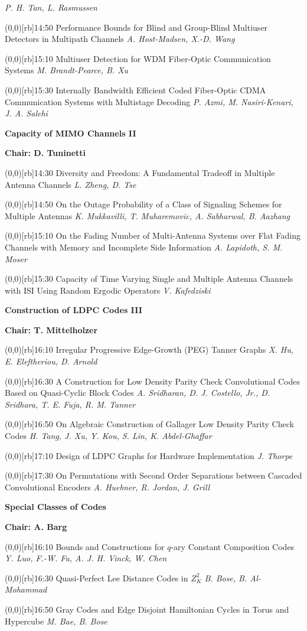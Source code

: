 \documentclass[a5paper,twoside]{article}
\def\period#1{\flushleft{\large\bfseries #1}\markboth{\sf #1}{\sf #1}}
\def\sesstitle#1{\vspace{.45\bigskipamount}\par{\bfseries #1}\par}
\def\sesschair#1{{\bfseries Chair: #1}\par\vspace{.65\medskipamount}}
\def\papertime#1{\makebox(0,0)[rb]{{\scriptsize #1}\hspace{.5em}}}
\def\papertitle#1{#1\hfil\break}
\def\paperauthors#1{{\itshape #1}\par\filbreak\vspace{.65\medskipamount}}
\begin{document}
\paperauthors{P. H. Tan, L. Rasmussen}
\papertime{14:50}%
\papertitle{Performance Bounds for Blind and Group-Blind Multiuser Detectors in Multipath Channels}
\paperauthors{A. Host-Madsen, X.-D. Wang}
\papertime{15:10}%
\papertitle{Multiuser Detection for WDM Fiber-Optic Communication Systems}
\paperauthors{M. Brandt-Pearce, B. Xu}
\papertime{15:30}%
\papertitle{Internally Bandwidth Efficient Coded Fiber-Optic CDMA Communication Systems with Multistage Decoding}
\paperauthors{P. Azmi, M. Nasiri-Kenari, J. A. Salehi}
\sesstitle{Capacity of MIMO Channels II}
\sesschair{D. Tuninetti}
\papertime{14:30}%
\papertitle{Diversity and Freedom: A Fundamental Tradeoff in Multiple Antenna Channels}
\paperauthors{L. Zheng, D. Tse}
\papertime{14:50}%
\papertitle{On the Outage Probability of a Class of Signaling Schemes for Multiple Antennas}
\paperauthors{K. Mukkavilli, T. Muharemovic, A. Sabharwal, B. Aazhang}
\papertime{15:10}%
\papertitle{On the Fading Number of Multi-Antenna Systems over Flat Fading Channels with Memory and Incomplete Side Information}
\paperauthors{A. Lapidoth, S. M. Moser}
\papertime{15:30}%
\papertitle{Capacity of Time Varying Single and Multiple Antenna Channels with ISI Using Random Ergodic Operators}
\paperauthors{V. Kafedziski}
\period{Fri 16:10 -- 17:50}
\sesstitle{Construction of LDPC Codes III}
\sesschair{T. Mittelholzer}
\papertime{16:10}%
\papertitle{Irregular Progressive Edge-Growth (PEG) Tanner Graphs}
\paperauthors{X. Hu, E. Eleftheriou, D. Arnold}
\papertime{16:30}%
\papertitle{A Construction for Low Density Parity Check Convolutional Codes Based on Quasi-Cyclic Block Codes}
\paperauthors{A. Sridharan, D. J. Costello, Jr., D. Sridhara, T. E. Fuja, R. M. Tanner}
\papertime{16:50}%
\papertitle{On Algebraic Construction of Gallager Low Density Parity Check Codes}
\paperauthors{H. Tang, J. Xu, Y. Kou, S. Lin, K. Abdel-Ghaffar}
\papertime{17:10}%
\papertitle{Design of LDPC Graphs for Hardware Implementation}
\paperauthors{J. Thorpe}
\papertime{17:30}%
\papertitle{On Permutations with Second Order Separations between Cascaded Convolutional Encoders}
\paperauthors{A. Huebner, R. Jordan, J. Grill}
\sesstitle{Special Classes of Codes}
\sesschair{A. Barg}
\papertime{16:10}%
\papertitle{Bounds and Constructions for $q$-ary Constant Composition Codes}
\paperauthors{Y. Luo, F.-W. Fu, A. J. H. Vinck, W. Chen}
\papertime{16:30}%
\papertitle{Quasi-Perfect Lee Distance Codes in $Z_K^2$}
\paperauthors{B. Bose, B. Al-Mohammad}
\papertime{16:50}%
\papertitle{Gray Codes and Edge Disjoint Hamiltonian Cycles in Torus and Hypercube}
\paperauthors{M. Bae, B. Bose}
\end{document}
